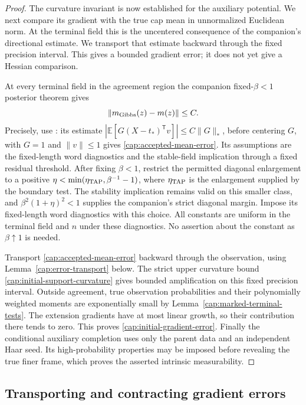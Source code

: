 \begin{proof}
The curvature invariant is now established for the auxiliary potential. We
next compare its gradient with the true cap mean in unnormalized Euclidean
norm. At the terminal field this is the uncentered consequence of the
companion's directional estimate. We transport that estimate backward through
the fixed precision interval. This gives a bounded gradient error; it does not
yet give a Hessian comparison.

At every terminal field in the agreement region the companion
fixed-$\beta<1$ posterior theorem gives
\begin{equation}\label{cap:accepted-mean-error}
 \|m_{\rm Gibbs}(z)-m(z)\|\le C.
\end{equation}
Precisely, use \cite[Section~7.2, proof of Proposition~7.2]{AcceptedGap}: its
estimate $|\mathbb E[G(X-t_*)^{\mathsf T}v]| \le C\|G\|_*$, before centering
$G$, with $G=1$ and $\|v\|\le1$ gives \eqref{cap:accepted-mean-error}. Its
assumptions are the fixed-length word diagnostics and the stable-field
implication through a fixed residual threshold. After fixing $\beta<1$,
restrict the permitted diagonal enlargement to a positive
$\eta<\min(\eta_{\rm TAP},\beta^{-1}-1)$, where $\eta_{\rm TAP}$ is the
enlargement supplied by the boundary test. The stability implication remains
valid on this smaller class, and $\beta^2(1+\eta)^2<1$ supplies the
companion's strict diagonal margin. Impose its fixed-length word diagnostics
with this choice. All constants are uniform in the terminal field and $n$
under these diagnostics. No assertion about the constant as $\beta\uparrow1$
is needed.

Transport \eqref{cap:accepted-mean-error} backward through the observation,
using Lemma~\ref{cap:error-transport} below. The strict upper curvature bound
\eqref{cap:initial-support-curvature} gives bounded amplification on this
fixed precision interval. Outside agreement, true observation probabilities
and their polynomially weighted moments are exponentially small by
Lemma~\ref{cap:marked-terminal-tests}. The extension gradients have at
most linear growth, so their contribution there tends to zero. This proves
\eqref{cap:initial-gradient-error}. Finally the conditional auxiliary
completion uses only the parent data and an independent Haar seed. Its
high-probability properties may be imposed before revealing the true finer
frame, which proves the asserted intrinsic measurability. \end{proof}

\subsection{Transporting and contracting gradient errors}

